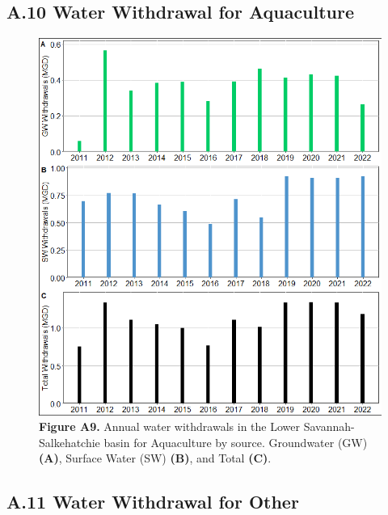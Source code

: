\documentclass[
]{article}
\begin{document}
\hypertarget{a.10-water-withdrawal-for-aquaculture}{%
\subsection{A.10 Water Withdrawal for
Aquaculture}\label{a.10-water-withdrawal-for-aquaculture}}

\begin{figure}[H]

{\centering \includegraphics{LSS_figures/trend-AQ_bar-plot-1} 

}

\caption{\textbf{Figure A9.} Annual water withdrawals in the Lower Savannah-Salkehatchie basin for Aquaculture by source. Groundwater (GW) \textbf{(A)}, Surface Water (SW) \textbf{(B)}, and Total \textbf {(C)}.}\label{fig:trend-AQ_bar-plot}
\end{figure}

\hypertarget{a.11-water-withdrawal-for-other}{%
\subsection{A.11 Water Withdrawal for
Other}\label{a.11-water-withdrawal-for-other}}
\end{document}
